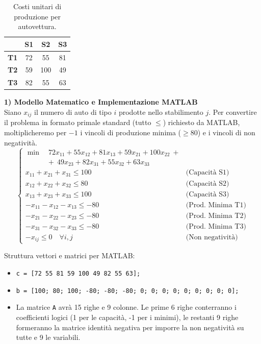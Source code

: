 \documentclass[12pt, a4paper]{article}
\renewcommand{\arraystretch}{1.25}
\begin{document}
	\begin{table}[H]
		\centering
		\renewcommand{\arraystretch}{1.3}
		\begin{tabular}{|c|c|c|c|}
			\hline
			& \textbf{S1} & \textbf{S2} & \textbf{S3} \\ \hline
			\textbf{T1} & 72 & 55 & 81 \\ \hline
			\textbf{T2} & 59 & 100 & 49 \\ \hline
			\textbf{T3} & 82 & 55 & 63 \\ \hline
		\end{tabular}
		\caption{Costi unitari di produzione per autovettura.}
	\end{table}
	
	\textbf{1) Modello Matematico e Implementazione MATLAB}\\
	Siano $x_{ij}$ il numero di auto di tipo $i$ prodotte nello stabilimento $j$. Per convertire il problema in formato primale standard (tutto $\leq$) richiesto da MATLAB, moltiplicheremo per $-1$ i vincoli di produzione minima ($\geq 80$) e i vincoli di non negatività.
	\[
	\begin{cases}
		\min \quad 72x_{11} + 55x_{12} + 81x_{13} + 59x_{21} + 100x_{22} \ + & \\
		\qquad \quad + \ 49x_{23} + 82x_{31} + 55x_{32} + 63x_{33} & \\[6pt]
		x_{11} + x_{21} + x_{31} \leq 100 &\text{(Capacità S1)} \\
		x_{12} + x_{22} + x_{32} \leq 80 &\text{(Capacità S2)} \\
		x_{13} + x_{23} + x_{33} \leq 100 &\text{(Capacità S3)} \\[6pt]
		-x_{11} - x_{12} - x_{13} \leq -80 &\text{(Prod. Minima T1)} \\
		-x_{21} - x_{22} - x_{23} \leq -80 &\text{(Prod. Minima T2)} \\
		-x_{31} - x_{32} - x_{33} \leq -80 &\text{(Prod. Minima T3)} \\[6pt]
		-x_{ij} \leq 0 \quad \forall i,j &\text{(Non negatività)}
	\end{cases}
	\]
	
	Struttura vettori e matrici per MATLAB:
	\begin{itemize}[label=$\circ$, itemsep=2pt, leftmargin=1.5cm]
		\item \texttt{c = [72 55 81 59 100 49 82 55 63];}
		\item \texttt{b = [100; 80; 100; -80; -80; -80; 0; 0; 0; 0; 0; 0; 0; 0; 0];}
		\item La matrice \texttt{A} avrà 15 righe e 9 colonne. Le prime 6 righe conterranno i coefficienti logici (1 per le capacità, -1 per i minimi), le restanti 9 righe formeranno la matrice identità negativa per imporre la non negatività su tutte e 9 le variabili.
	\end{itemize}
	
\end{document}
